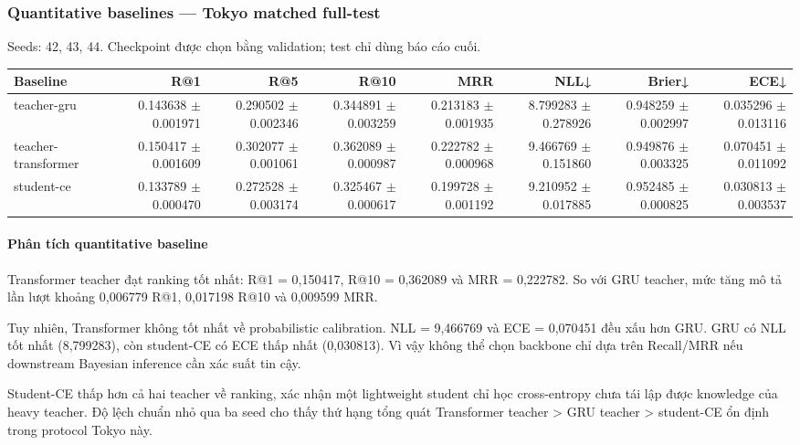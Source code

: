 \subsubsection*{Quantitative baselines --- Tokyo matched full-test}

Seeds: 42, 43, 44. Checkpoint được chọn bằng validation; test chỉ dùng báo cáo cuối.

\begin{table}[!htbp]
\centering
\scriptsize
\setlength{\tabcolsep}{2.5pt}
\begin{adjustbox}{max width=\textwidth}
\begin{tabular}{@{}lrrrrrrr@{}}
\toprule
Baseline & R@1 & R@5 & R@10 & MRR & NLL↓ & Brier↓ & ECE↓ \\
\midrule
teacher-gru & 0.143638 $\pm$ 0.001971 & 0.290502 $\pm$ 0.002346 & 0.344891 $\pm$ 0.003259 & 0.213183 $\pm$ 0.001935 & 8.799283 $\pm$ 0.278926 & 0.948259 $\pm$ 0.002997 & 0.035296 $\pm$ 0.013116 \\
teacher-transformer & 0.150417 $\pm$ 0.001609 & 0.302077 $\pm$ 0.001061 & 0.362089 $\pm$ 0.000987 & 0.222782 $\pm$ 0.000968 & 9.466769 $\pm$ 0.151860 & 0.949876 $\pm$ 0.003325 & 0.070451 $\pm$ 0.011092 \\
student-ce & 0.133789 $\pm$ 0.000470 & 0.272528 $\pm$ 0.003174 & 0.325467 $\pm$ 0.000617 & 0.199728 $\pm$ 0.001192 & 9.210952 $\pm$ 0.017885 & 0.952485 $\pm$ 0.000825 & 0.030813 $\pm$ 0.003537 \\
\bottomrule
\end{tabular}
\end{adjustbox}
\end{table}

\paragraph{Phân tích quantitative baseline}

Transformer teacher đạt ranking tốt nhất: R@1 = 0,150417, R@10 = 0,362089 và MRR = 0,222782. So với GRU teacher, mức tăng mô tả lần lượt khoảng 0,006779 R@1, 0,017198 R@10 và 0,009599 MRR.

Tuy nhiên, Transformer không tốt nhất về probabilistic calibration. NLL = 9,466769 và ECE = 0,070451 đều xấu hơn GRU. GRU có NLL tốt nhất (8,799283), còn student-CE có ECE thấp nhất (0,030813). Vì vậy không thể chọn backbone chỉ dựa trên Recall/MRR nếu downstream Bayesian inference cần xác suất tin cậy.

Student-CE thấp hơn cả hai teacher về ranking, xác nhận một lightweight student chỉ học cross-entropy chưa tái lập được knowledge của heavy teacher. Độ lệch chuẩn nhỏ qua ba seed cho thấy thứ hạng tổng quát Transformer teacher > GRU teacher > student-CE ổn định trong protocol Tokyo này.

